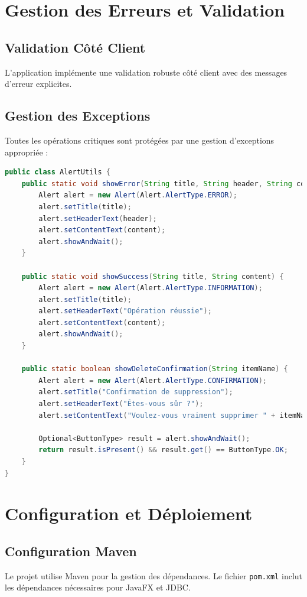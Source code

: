 \documentclass{rapportENSIAS}
\begin{document}
\section{Gestion des Erreurs et Validation}

\subsection{Validation C\^{o}t\'{e} Client}
L'application impl\'{e}mente une validation robuste c\^{o}t\'{e} client avec des messages d'erreur explicites.

\subsection{Gestion des Exceptions}
Toutes les op\'{e}rations critiques sont prot\'{e}g\'{e}es par une gestion d'exceptions appropri\'{e}e :

\begin{lstlisting}[language=Java, caption=Utilitaire d'alertes]
public class AlertUtils {
    public static void showError(String title, String header, String content) {
        Alert alert = new Alert(Alert.AlertType.ERROR);
        alert.setTitle(title);
        alert.setHeaderText(header);
        alert.setContentText(content);
        alert.showAndWait();
    }
    
    public static void showSuccess(String title, String content) {
        Alert alert = new Alert(Alert.AlertType.INFORMATION);
        alert.setTitle(title);
        alert.setHeaderText("Opération réussie");
        alert.setContentText(content);
        alert.showAndWait();
    }
    
    public static boolean showDeleteConfirmation(String itemName) {
        Alert alert = new Alert(Alert.AlertType.CONFIRMATION);
        alert.setTitle("Confirmation de suppression");
        alert.setHeaderText("Êtes-vous sûr ?");
        alert.setContentText("Voulez-vous vraiment supprimer " + itemName + " ?");
        
        Optional<ButtonType> result = alert.showAndWait();
        return result.isPresent() && result.get() == ButtonType.OK;
    }
}
\end{lstlisting}

\section{Configuration et D\'{e}ploiement}

\subsection{Configuration Maven}
Le projet utilise Maven pour la gestion des d\'{e}pendances. Le fichier \texttt{pom.xml} inclut les d\'{e}pendances n\'{e}cessaires pour JavaFX et JDBC.
\end{document}
